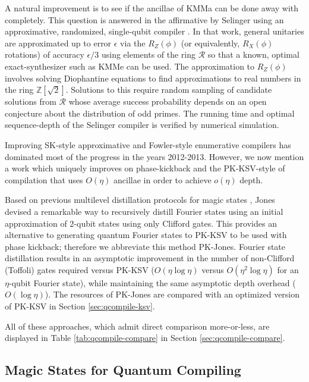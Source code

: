 A natural improvement is to see if the ancillae of KMMa can be done away with
completely. This question is answered in the affirmative by
Selinger using an approximative, randomized, single-qubit compiler
\cite{Selinger2012}. In that work, general unitaries are approximated up to
error $\epsilon$ via the $R_Z(\phi)$ (or equivalently, $R_X(\phi)$ rotations)
of accuracy $\epsilon/3$ using elements of the
ring $\mathcal{R}$ so that a known, optimal exact-synthesizer such as KMMe
can be used. The approximation to $R_Z(\phi)$ involves solving
Diophantine equations to find approximations to real numbers in the
ring $\mathbb{Z}\left[\sqrt{2}\right]$. Solutions to this require
random sampling of candidate solutions from $\mathcal{R}$ whose average
success probability depends on an open conjecture about the distribution
of odd primes. The running time and optimal sequence-depth of the
Selinger compiler is verified by numerical simulation.

Improving SK-style approximative and Fowler-style enumerative compilers has
dominated most of the progress in the years 2012-2013. However, we now mention
a work which uniquely improves on phase-kickback and the PK-KSV-style of
compilation that uses $O(\eta)$ ancillae in order to achieve $o(\eta)$
depth.

Based on previous multilevel distillation protocols for magic states \cite{Jones2012},
Jones devised a remarkable way to recursively distill Fourier states using an
initial approximation of $2$-qubit states using only Clifford gates. This provides
an alternative to generating quantum Fourier states to PK-KSV to be used with
phase kickback; therefore we abbreviate this method PK-Jones. Fourier state
distillation results
in an asymptotic improvement in the number of non-Clifford (Toffoli) gates
required versus PK-KSV ($O(\eta\log \eta)$ versus $O(\eta^2\log \eta)$ for an
$\eta$-qubit Fourier state), while maintaining the same asymptotic depth overhead
($O(\log \eta)$). The resources of PK-Jones are compared with an optimized version of PK-KSV in
Section \ref{sec:qcompile-ksv}.

All of these approaches, which admit direct comparison more-or-less, are
displayed in Table \ref{tab:qcompile-compare} in Section
\ref{sec:qcompile-compare}.

\subsection{Magic States for Quantum Compiling}


